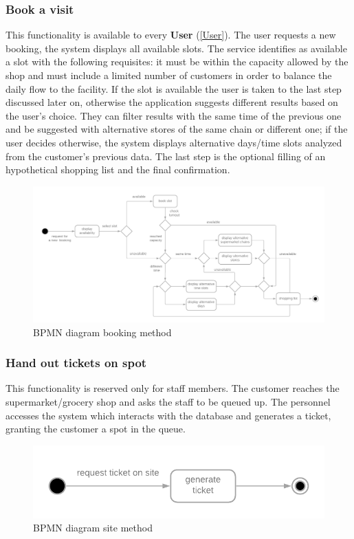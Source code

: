\documentclass[table, 12pt]{article}
\begin{document}
\subsubsection{Book a visit}
\label{book_a_visit}
This functionality is available to every \textbf{User} (\ref{User}). The user requests a new booking, the system displays all available slots. The service identifies as available a slot with the following requisites: it must be within the capacity allowed by the shop and must include a limited number of customers in order to balance the daily flow to the facility. If the slot is available the user is taken to the last step discussed later on, otherwise the application suggests different results based on the user's choice. They can filter results with the same time of the previous one and be suggested with alternative stores of the same chain or different one; if the user decides otherwise, the system displays alternative days/time slots analyzed from the customer's previous data.
The last step is the optional filling of an hypothetical shopping list and the final confirmation.
\begin{figure}[!htb]
    \begin{center}
        \includegraphics[scale=0.2]{assets/function-book-a-visit.png}
        \caption{BPMN diagram booking method}
    \end{center}
\end{figure}

\subsubsection{Hand out tickets on spot}

This functionality is reserved only for staff members. The customer reaches the supermarket/grocery shop and asks the staff to be queued up. The personnel accesses the system which interacts with the database and generates a ticket, granting the customer a spot in the queue.
\begin{figure}[!htb]
    \begin{center}
        \includegraphics[scale=0.5]{assets/function-hand-up.png}
        \caption{BPMN diagram site method}
    \end{center}
\end{figure}
\end{document}
